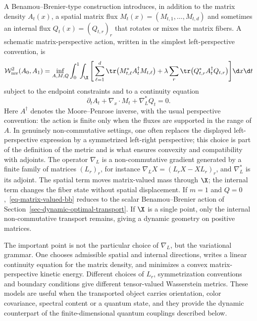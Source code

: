 A Benamou--Brenier-type construction introduces, in addition to the matrix density $A_t(x)$, a spatial matrix flux $M_t(x)=(M_{t,1},\ldots,M_{t,d})$ and sometimes an internal flux $Q_t(x)=(Q_{t,r})_r$ that rotates or mixes the matrix fibers. A schematic matrix-perspective action, written in the simplest left-perspective convention, is
\begin{equation}\label{eq-matrix-valued-bb}
\begin{aligned}
\mathcal W_{\mathrm{mv}}^2(A_0,A_1)
=\inf_{A,M,Q}\int_0^1\!\int_\X
\Bigg[
\sum_{\ell=1}^d \tr\big(M_{t,\ell}^* A_t^\dagger M_{t,\ell}\big)
+\lambda\sum_r \tr\big(Q_{t,r}^* A_t^\dagger Q_{t,r}\big)
\Bigg]\d x\d t
\end{aligned}
\end{equation}
subject to the endpoint constraints and to a continuity equation
\begin{equation}\label{eq-matrix-valued-continuity}
\partial_t A_t+\nabla_x\cdot M_t+\nabla_L^* Q_t=0.
\end{equation}
Here $A^\dagger$ denotes the Moore--Penrose inverse, with the usual perspective convention: the action is finite only when the fluxes are supported in the range of $A$. In genuinely non-commutative settings, one often replaces the displayed left-perspective expression by a symmetrized left-right perspective; this choice is part of the definition of the metric and is what ensures convexity and compatibility with adjoints. The operator $\nabla_L$ is a non-commutative gradient generated by a finite family of matrices $(L_r)_r$, for instance $\nabla_L X=(L_rX-XL_r)_r$, and $\nabla_L^*$ is its adjoint. The spatial term moves matrix-valued mass through $\X$; the internal term changes the fiber state without spatial displacement. If $m=1$ and $Q=0$,~\eqref{eq-matrix-valued-bb} reduces to the scalar Benamou--Brenier action of Section~\ref{sec-dynamic-optimal-transport}. If $\X$ is a single point, only the internal non-commutative transport remains, giving a dynamic geometry on positive matrices.

The important point is not the particular choice of $\nabla_L$, but the variational grammar. One chooses admissible spatial and internal directions, writes a linear continuity equation for the matrix density, and minimizes a convex matrix-perspective kinetic energy. Different choices of $L_r$, symmetrization conventions and boundary conditions give different tensor-valued Wasserstein metrics. These models are useful when the transported object carries orientation, color covariance, spectral content or a quantum state, and they provide the dynamic counterpart of the finite-dimensional quantum couplings described below.


